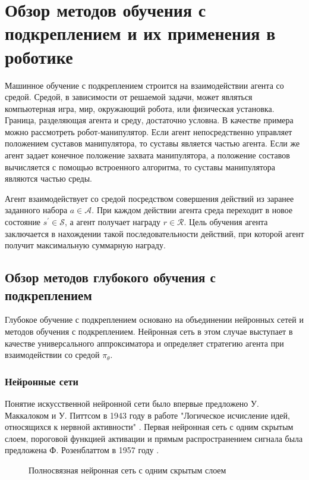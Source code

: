 \chapter{Обзор методов обучения с подкреплением и их применения в роботике}\label{ch:ch1}

Машинное обучение с подкреплением строится на взаимодействии агента со средой. Средой, в зависимости от решаемой задачи, может являться компьютерная игра, мир, окружающий робота, или физическая установка. Граница, разделяющая агента и среду, достаточно условна. В качестве примера можно рассмотреть робот-манипулятор. Если агент непосредственно управляет положением суставов манипулятора, то суставы является частью агента. Если же агент задает конечное положение захвата манипулятора, а положение составов вычисляется с помощью встроенного алгоритма, то суставы манипулятора являются частью среды. 

Агент взаимодействует со средой посредством совершения  действий из заранее заданного набора $a \in \mathcal{A}$. При каждом действии агента среда переходит в новое состояние $s^{\prime} \in \mathcal{S}$, а агент получает награду $r \in \mathcal{R}$.
Цель обучения агента заключается в нахождении такой последовательности действий, при которой агент получит максимальную суммарную награду.

\section{Обзор методов глубокого обучения с подкреплением}\label{sec:ch1/sec1}

Глубокое обучение с подкреплением основано на объединении нейронных сетей и методов обучения с подкреплением. Нейронная сеть в этом случае выступает в качестве универсального аппроксиматора и определяет стратегию агента при взаимодействии со средой $\pi_{\theta}$.

\subsection{Нейронные сети}

Понятие искусственной нейронной сети было впервые предложено У. Маккалоком и У. Питтсом в 1943 году в работе "Логическое исчисление идей, относящихся к нервной активности" \cite{McCulloch1943}. Первая нейронная сеть с одним скрытым слоем, пороговой функцией активации и прямым распространением сигнала была предложена Ф. Розенблаттом в 1957 году \cite{rosenblatt}.

\begin{figure}[ht]
	\caption{Полносвязная нейронная сеть с одним скрытым слоем}
	\label{fig:fcnn}
\end{figure}

